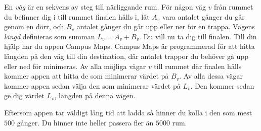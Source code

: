 En \emph{väg} är en sekvens av steg till närliggande rum.
För någon väg $v$ från rummet du befinner dig i till rummet finalen hålls i,
låt $A_v$ vara antalet gånger du går genom en dörr,
och $B_v$ antalet gånger du går upp eller ner för en trappa.
Vägens \emph{längd} definieras som summan $L_v = A_v + B_v$.
Du vill nu ta dig till finalen. Till din hjälp har du appen Campus Maps.
Campus Maps är programmerad för att hitta längden på den väg till din destination,
där antalet trappor du behöver gå upp eller ned för minimeras.
Av alla möjliga vägar $v$ till rummet där finalen hålls kommer appen att hitta de som minimerar värdet på $B_v$.
Av alla dessa vägar kommer appen sedan välja den som minimerar värdet på $L_v$.
Den kommer sedan ge dig värdet $L_v$, längden på denna vägen.

Eftersom appen tar väldigt lång tid att ladda så hinner du kolla i den som mest $500$ gånger. 
Du hinner inte heller passera fler än $5000$ rum.


